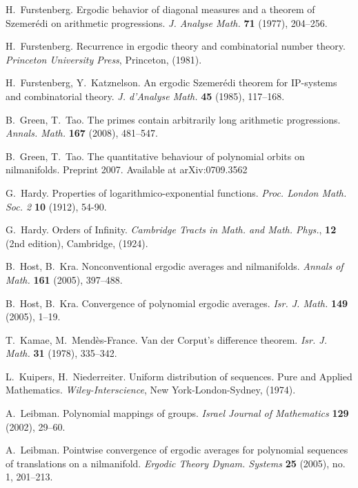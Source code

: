 \documentclass[11pt]{amsart}
\theoremstyle{plain}
\theoremstyle{definition}
\theoremstyle{remark}
\begin{document}
\begin{thebibliography}{9999}
 H.~Furstenberg.  Ergodic behavior of diagonal
  measures and a theorem of Szemer\'edi on arithmetic progressions.
  {\em J. Analyse Math.} \textbf{71} (1977), 204--256.

 H.~Furstenberg.  Recurrence in ergodic theory and
  combinatorial number theory. {\em Princeton University Press},
  Princeton, (1981).




 H.~Furstenberg, Y.~Katznelson.  An ergodic
  Szemer\'edi theorem for IP-systems and combinatorial theory. {\it J.
    d'Analyse Math.} \textbf{45} (1985), 117--168.

 B.~Green, T.~Tao.
The primes contain arbitrarily long arithmetic progressions.  {\it Annals. Math.}
\textbf{167} (2008), 481--547.

 B.~Green, T.~Tao.  The quantitative behaviour of
  polynomial orbits on nilmanifolds. Preprint 2007. Available at
  arXiv:0709.3562

 G.~Hardy. Properties of logarithmico-exponential
  functions. {\em Proc. London Math. Soc. 2} \textbf{10} (1912),
  54-90.

 G.~Hardy.  Orders of Infinity. {\em Cambridge
    Tracts in Math. and Math. Phys.}, \textbf{12} (2nd edition), Cambridge,
  (1924).


 B.~Host, B.~Kra.  Nonconventional ergodic averages
  and nilmanifolds. {\em Annals of Math.} \textbf{161} (2005),
  397--488.

 B.~Host, B.~Kra.  Convergence of polynomial
  ergodic averages. {\it Isr. J. Math.} \textbf{149} (2005), 1--19.


 T.~Kamae, M.~Mend\`es-France. Van der Corput's
  difference theorem.  {\it Isr. J. Math.} \textbf{31} (1978),
  335--342.

 L.~Kuipers, H.~Niederreiter.  Uniform distribution
  of sequences.  Pure and Applied Mathematics. {\em
    Wiley-Interscience}, New York-London-Sydney, (1974).

 A.~Leibman. Polynomial mappings of groups.  {\em
    Israel Journal of Mathematics} \textbf{129} (2002), 29--60.

 A.~Leibman.  Pointwise convergence of ergodic
  averages for polynomial sequences of translations on a nilmanifold.
  {\it Ergodic Theory Dynam.  Systems} \textbf{25} (2005), no. 1,
  201--213.



\end{thebibliography}
\end{document}
